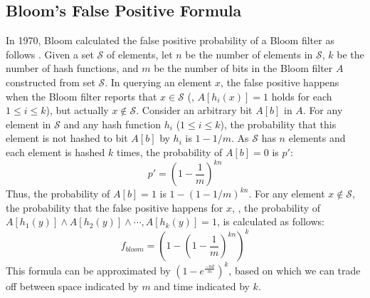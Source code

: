 \presub \subsection{Bloom's False Positive Formula} \postsub
%
In 1970, Bloom calculated the false positive probability of a Bloom filter as follows \cite{BF1970}.
%
Given a set $\mathcal{S}$ of elements, let $n$ be the number of elements in $\mathcal{S}$, $k$ be the number of hash functions, and $m$ be the number of bits in the Bloom filter $A$ constructed from set $\mathcal{S}$.
%
In querying an element $x$, the false positive happens when the Bloom filter reports that $x \in \mathcal{S}$ (\ie, $A[h_i(x)]=1$ holds for each $1 \leqslant i \leqslant k$), but actually $x \notin \mathcal{S}$.
%
Consider an arbitrary bit $A[b]$ in $A$.
%
For any element in $\mathcal{S}$ and any hash function $h_i$ ($1 \leqslant i \leqslant k$), the probability that this element is not hashed to bit $A[b]$ by $h_i$ is $1-1/m$.
%
As $\mathcal{S}$ has $n$ elements and each element is hashed $k$ times, the probability of $A[b]=0$ is $p'$:
%
\begin{equation}
p'=\left(1-\dfrac{1}{m}\right)^{kn}
\label{p'form}
\end{equation}
%
Thus, the probability of $A[b]=1$ is $1-(1-1/m)^{kn}$.
%
For any element $x \notin \mathcal{S}$, the probability that the false positive happens for $x$, \ie, the probability of $A[h_1(y)] \wedge A[h_2(y)] \wedge \cdots, A[h_{k}(y)]=1$, is calculated as follows:
%
\begin{equation}
\label{fBloom}
f_{bloom} = \left(1 - \left(1 - \frac{1}{m}\right)^{kn}\right)^k
\end{equation}
%
This formula can be approximated by $(1-e^{\frac{-nk}{m}})^k$, based on which we can trade off between space indicated by $m$ and time indicated by $k$.

\presub

